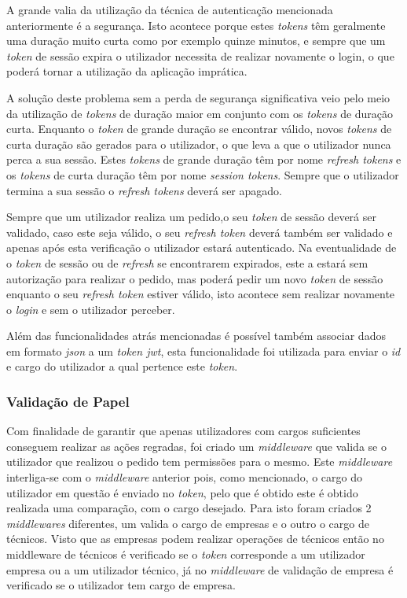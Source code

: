 A grande valia da utilização da técnica de autenticação mencionada anteriormente é a segurança. Isto acontece porque estes \textit{tokens} têm geralmente uma duração muito curta como por exemplo quinze minutos, e sempre que um \textit{token} de sessão expira o utilizador necessita de realizar novamente o login, o que poderá tornar a utilização da aplicação imprática.

A solução deste problema sem a perda de segurança significativa veio pelo meio da utilização de \textit{tokens} de duração maior em conjunto com os \textit{tokens} de duração curta. Enquanto o \textit{token} de grande duração se encontrar válido, novos \textit{tokens} de curta duração são gerados para o utilizador, o que leva a que o utilizador nunca perca a sua sessão. Estes \textit{tokens} de grande duração têm por nome \textit{refresh tokens} e os \textit{tokens} de curta duração têm por nome \textit{session tokens}. Sempre que o utilizador termina a sua sessão o \textit{refresh tokens} deverá ser apagado.

Sempre que um utilizador realiza um pedido,o seu \textit{token} de sessão deverá ser validado, caso este seja válido, o seu \textit{refresh token} deverá também ser validado e apenas após esta verificação o utilizador estará autenticado. Na eventualidade de o \textit{token} de sessão ou de \textit{refresh} se encontrarem expirados, este a estará sem autorização para realizar o pedido, mas poderá pedir um novo \textit{token} de sessão enquanto o seu \textit{refresh token} estiver válido, isto acontece sem realizar novamente o \textit{login} e sem o utilizador perceber.

 Além das funcionalidades atrás mencionadas é possível também associar dados em formato \textit{json} a um \textit{token jwt}, esta funcionalidade foi utilizada para enviar o \textit{id} e cargo do utilizador a qual pertence este \textit{token}.

 \newpage

\subsubsection{Validação de Papel}

Com finalidade de garantir que apenas utilizadores com cargos suficientes conseguem realizar as ações regradas, foi criado um \textit{middleware} que valida se o utilizador que realizou o pedido tem permissões para o mesmo. Este \textit{middleware} interliga-se com o \textit{middleware} anterior pois, como mencionado, o cargo do utilizador em questão é enviado no \textit{token}, pelo que é obtido este é obtido realizada uma comparação, com o cargo desejado. Para isto foram criados 2 \textit{middlewares} diferentes, um valida o cargo de empresas e o outro o cargo de técnicos. Visto que as empresas podem realizar operações de técnicos então no middleware de técnicos é verificado se o \textit{token} corresponde a um utilizador empresa ou a um utilizador técnico, já no \textit{middleware} de validação de empresa é verificado se o utilizador tem cargo de empresa.


